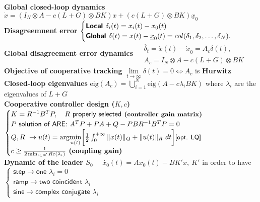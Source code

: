 \documentclass[a4paper, 12pt]{article}
\begin{document}
\noindent
\textbf{Global closed-loop dynamics} $ \dot{x} = (I_N \otimes A - c(L+G)\otimes BK)x +
(c(L+G)\otimes BK)\underline{x}_{0}$\\
\textbf{Disagreemnent error} $\begin{cases}
    \textsf{\textbf{Local }}   \delta_i(t) = x_i(t) - {x}_0(t)\\
    \textsf{\textbf{Global }}   \delta(t) = x(t)-\underline{x}_0(t)=col(\delta_1, \delta_2, \dots, \delta_N).
\end{cases}$\\
\textbf{Global disagreement error dynamics} $\begin{aligned}
    &\dot{\delta_t} = \dot{x}(t) - \dot{\underline{x}}_0 = A_c \delta(t), \label{eq:GDE} \\
    &A_c = I_N \otimes A - c(L+G)\otimes BK
\end{aligned}$\\

\noindent
\textbf{\color{blue}Objective of cooperative tracking} 
$\underset{t\to\infty}{\lim}  \delta(t) = 0 \iff
A_c$ is \textbf{Hurwitz}\\
\textbf{Closed-loop eigenvalues} $\text{eig}(A_c) = \bigcup_{i=1}^N \text{eig}(A-c \lambda_iBK)$ where $\lambda_i$ are the eigenvalues of $L+G$\\

\noindent
\textbf{Cooperative controller design ($K, c$)} $\begin{cases}
    K = R^{-1} B^T P,  \quad R \textsf{ properly selected} \textbf{ \small (controller gain matrix)}\\
    P \ \textsf{solution of ARE: } A^T P + PA + Q - PBR^{-1}B^T P = 0\\
    Q, R \ \to  u(t) = \text{arg}\underset{u(t)}{\min}\bigg[
        \frac{1}{2} \int_0^{+\infty} {
            \Vert x(t) \Vert_Q + 
            \Vert u(t) \Vert_R
        } \ dt \bigg] \textsf{\small[opt. LQ]}\\
    c \ge \frac{1} {2 \min_{i\in\mathcal{N}} Re(\lambda_i)} \textbf{ (coupling gain)} 
\end{cases}$\\

\noindent
\textbf{Dynamic of the leader $S_0$} $\quad \dot{x_0}(t) = A x_0(t)- BK'x, \ K'$ in order to have $\begin{cases}
    \textsf{step} \to \textsf{one $\lambda_i=0$}\\
    \textsf{ramp} \to \textsf{two coincident $\lambda_i$}\\
    \textsf{sine} \to \textsf{complex conjugate $\lambda_i$}
\end{cases}$\\
\end{document}
